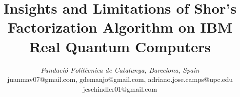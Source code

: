 \documentclass[conference,twoside]{IEEEtran}
\begin{document}
\title{Insights and Limitations of Shor's Factorization Algorithm on IBM Real Quantum Computers}

\author{
\textit{Fundació Politècnica de Catalunya, Barcelona, Spain }\\
juanmav07@gmail.com, gdemanjo@gmail.com, adriano.jose.camps@upc.edu\\jcschindler01@gmail.com}

\maketitle
\end{document}
